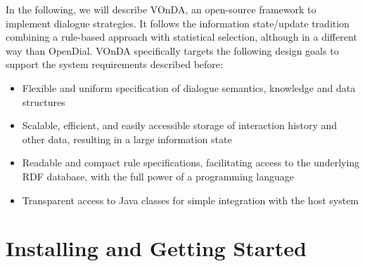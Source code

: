 \documentclass[a4paper]{report}
\newcommand{\vonda}{VOnDA\xspace}
\begin{document}
In the following, we will describe \vonda, an open-source framework to
implement dialogue strategies. It follows the information state/update
tradition \citep{traum2003information}
combining a rule-based approach with statistical selection, although in a
different way than OpenDial. \vonda specifically targets the following design
goals to support the system requirements described before:

\begin{itemize}
  \addtolength{\itemsep}{-.6\itemsep}
\item Flexible and uniform specification of dialogue semantics, knowledge and
  data structures
\item Scalable, efficient, and easily accessible storage of interaction history
  and other data, resulting in a large information state
\item Readable and compact rule specifications, facilitating access to the
  underlying RDF database, with the full power of a programming language
\item Transparent access to Java classes for simple integration with the host
  system
\end{itemize}
\fi



%

\chapter{Installing and Getting Started}


\newpage

\newpage




\end{document}
